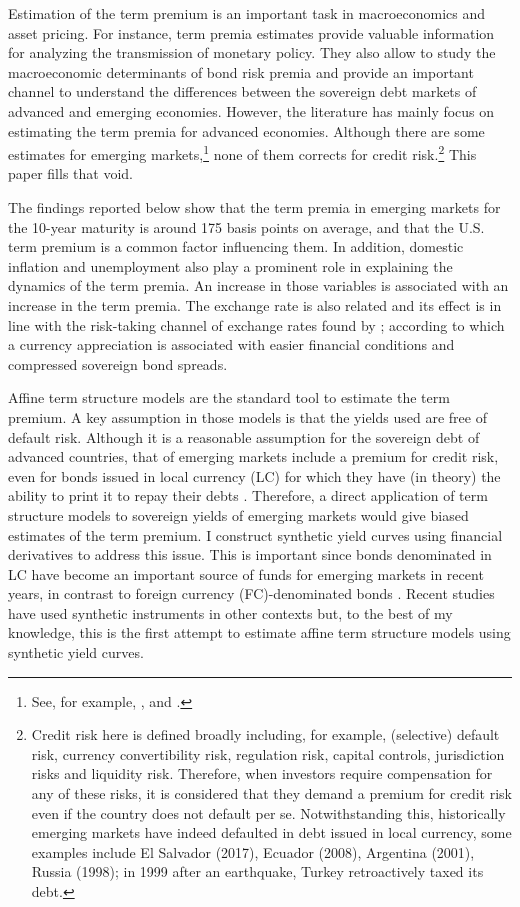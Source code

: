 Estimation of the term premium is an important task in macroeconomics and asset pricing. For instance, term premia estimates provide valuable information for analyzing the transmission of monetary policy. They also allow to study the macroeconomic determinants of bond risk premia and provide an important channel to understand the differences between the sovereign debt markets of advanced and emerging economies. However, the literature has mainly focus on estimating the term premia for advanced economies. Although there are some estimates for emerging markets,\footnote{See, for example, \cite*{DePooter_etal:2013}, and \cite*{BlakeRuleRummel:2015}.} none of them corrects for credit risk.\footnote{Credit risk here is defined broadly including, for example, (selective) default risk, currency convertibility risk, regulation risk, capital controls, jurisdiction risks and liquidity risk. Therefore, when investors require compensation for any of these risks, it is considered that they demand a premium for credit risk even if the country does not default per se. Notwithstanding this, historically emerging markets have indeed defaulted in debt issued in local currency, some examples include El Salvador (2017), Ecuador (2008), Argentina (2001), Russia (1998); in 1999 after an earthquake, Turkey retroactively taxed its debt.} This paper fills that void.

The findings reported below show that the term premia in emerging markets for the 10-year maturity is around 175 basis points on average, and that the U.S. term premium is a common factor influencing them. In addition, domestic inflation and unemployment also play a prominent role in explaining the dynamics of the term premia. An increase in those variables is associated with an increase in the term premia. The exchange rate is also related and its effect is in line with the risk-taking channel of exchange rates found by \citet*{HofmannShimShin:2017}; according to which a currency appreciation is associated with easier financial conditions and compressed sovereign bond spreads.

Affine term structure models are the standard tool to estimate the term premium. A key assumption in those models is that the yields used are free of default risk. Although it is a reasonable assumption for the sovereign debt of advanced countries, that of emerging markets include a premium for credit risk, even for bonds issued in local currency (LC) for which they have (in theory) the ability to print it to repay their debts \citep{DuSchreger:2016a}. Therefore, a direct application of term structure models to sovereign yields of emerging markets would give biased estimates of the term premium. I construct synthetic yield curves using financial derivatives to address this issue. This is important since bonds denominated in LC have become an important source of funds for emerging markets in recent years, in contrast to foreign currency (FC)-denominated bonds \citep{DuSchreger:2016b}. Recent studies have used synthetic instruments in other contexts but, to the best of my knowledge, this is the first attempt to estimate affine term structure models using synthetic yield curves.


